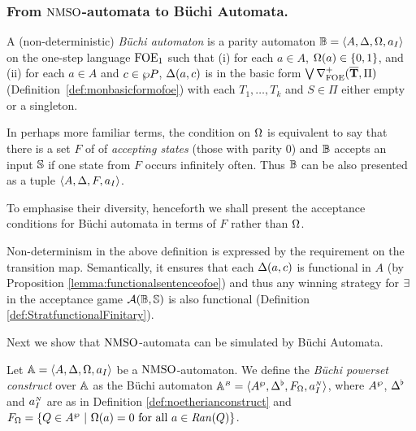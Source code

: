 \subsubsection{From $\mathrm{NMSO}$-automata to B\"{u}chi Automata.}


\begin{definition} A (non-deterministic) \emph{B\"{u}chi automaton} is a parity automaton $\mathbb{B} = \langle{A,\Delta,\Omega,a_I}\rangle$ on the one-step language $\mathrm{FOE}_1$ such that (i) for each $a \in A$, $\Omega(a) \in \{0,1\}$, and (ii) for each $a \in A$  and $c \in \wp P$, $\Delta(a,c)$ is in the basic form $\bigvee \nabla^+_{\mathrm{FOE}}(\overline{{\mathbf{T}}},\Pi)$ (Definition~\ref{def:monbasicformofoe}) with each $T_1,\dots,T_k$ and $S \in \Pi$ either empty or a singleton. 

In perhaps more familiar terms, the condition on $\Omega$ is equivalent to say that there is a set $F$ of  of \emph{accepting states} (those with parity $0$) and $\mathbb{B}$ accepts an input $\mathbb{S}$ if one state from $F$ occurs infinitely often. Thus $\mathbb{B}$ can be also presented as a tuple $\langle{A,\Delta,F,a_I}\rangle$.
\end{definition}

To emphasise their diversity, henceforth we shall present the acceptance conditions for B\"{u}chi automata in terms of $F$ rather than $\Omega$. 

\begin{remark} \label{rmk:Buchifunctional}
Non-determinism in the above definition is expressed by the requirement on the transition map. Semantically, it ensures that each $\Delta(a,c)$ is functional in $A$ (by Proposition \ref{lemma:functionalsentenceofoe}) and thus any winning strategy for $\exists$ in the acceptance game $\mathcal{A}(\mathbb{B},\mathbb{S})$ is also functional (Definition \ref{def:StratfunctionalFinitary}).\end{remark}

Next we show that $\mathrm{NMSO}$-automata can be simulated by B\"{u}chi Automata.

\begin{definition}
\label{DEF_BuchiPowersetConstruction}
Let $\mathbb{A} = \langle{A,\Delta,\Omega,a_I}\rangle$ be a $\mathrm{NMSO}$-automaton. We define the \emph{B\"{u}chi powerset construct} over
$\mathbb{A}$ as the B\"{u}chi automaton $\mathbb{A}^{{\scriptscriptstyle B}} = \langle{A^{\wp}, \Delta^{\flat},F_{\Omega},a_I^{{\scriptscriptstyle N}}}\rangle$, where $A^{\wp}$, $\Delta^{\flat}$ and $a_I^{{\scriptscriptstyle N}}$ are as in Definition \ref{def:noetherianconstruct} and $F_{\pmap} = \{Q \in \shA\ |\ \pmap(a)=0 \text{ for all } a \in \mathit{Ran}(Q)\}$.
\end{definition}

